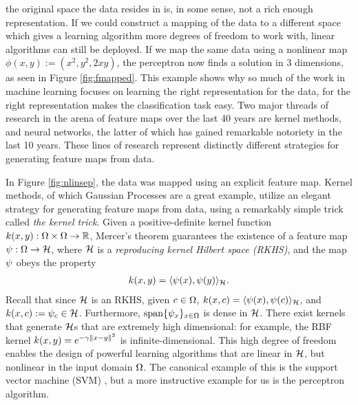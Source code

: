 the original space the data resides in is, in some sense, not a rich enough representation. If we could construct a mapping of the data to a
different space which gives a learning algorithm more degrees of freedom to work with, linear algorithms can still be deployed. 
If we map the same data using a nonlinear map $\phi(x,y):= (x^2, y^2, 2xy)$, the perceptron now finds a solution
in 3 dimensions, as seen in Figure \ref{fig:fmapped}. This example shows why so much of the work in machine learning focuses on 
learning the right representation for the data, for the right representation makes the classification task easy. Two major threads of 
research in the arena of feature maps over the last 40 years are kernel methods, and neural networks, the latter
of which has gained remarkable notoriety in the last 10 years. 
These lines of research represent distinctly different strategies for generating feature maps from data. 

In Figure \ref{fig:nlinsep}, the data was mapped using an explicit feature map. Kernel methods, of which Gaussian Processes are a great example, utilize an elegant strategy for generating
feature maps from data, using a remarkably simple trick called \emph{the kernel trick}. Given a positive-definite kernel function 
$k(x,y):\Omega\times\Omega\to\mathbb{R}$, Mercer's theorem guarantees the existence of a feature map $\psi:\Omega\to\mathcal{H}$, where $\mathcal{H}$
is a \emph{reproducing kernel Hilbert space (RKHS)}, and the map $\psi$ obeys the property 
\begin{align}\eqlabel{kmap}
 \kernel(x,y) = \l\fmap(x), \fmap(y)\r_{\fspace}.
\end{align}
Recall that since $\mathcal{H}$ is an RKHS, given $c\in\Omega$, $k(x, c) = \langle\psi(x), \psi(c)\rangle_{\mathcal{H}}$, 
and $k(x, c) := \psi_c\in\mathcal{H}$. Furthermore, $\operatorname{span}\{\psi_x\}_{x\in\Omega}$ is dense in $\mathcal{H}$. There exist kernels 
that generate $\mathcal{H}$s that are extremely high dimensional: for example, the RBF kernel $k(x,y) = e^{-\gamma\|x-y\|^2}$
is infinite-dimensional. This high degree of freedom enables the design of powerful learning algorithms that are linear in $\mathcal{H}$,
but nonlinear in the input domain $\Omega$. The canonical example of this is the support vector machine (SVM) \cite{cortes1995support},
but a more instructive example for us is the perceptron algorithm. 


